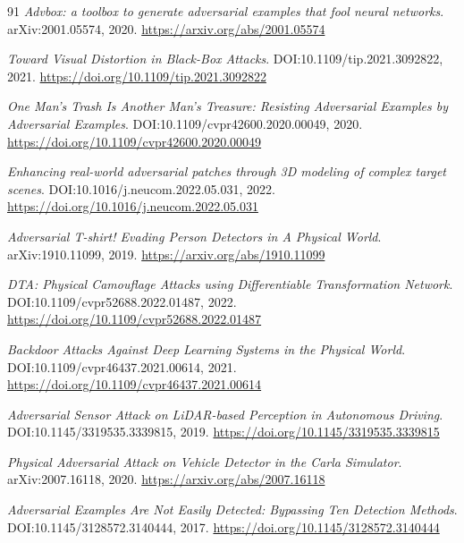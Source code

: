 \documentclass[11pt,a4paper]{article}
\begin{document}
\begin{thebibliography}{91}
\newblock \emph{Advbox: a toolbox to generate adversarial examples that fool neural networks}.
\newblock arXiv:2001.05574, 2020.
\newblock \url{https://arxiv.org/abs/2001.05574}

\newblock \emph{Toward Visual Distortion in Black-Box Attacks}.
\newblock DOI:10.1109/tip.2021.3092822, 2021.
\newblock \url{https://doi.org/10.1109/tip.2021.3092822}

\newblock \emph{One Man's Trash Is Another Man's Treasure: Resisting Adversarial Examples by Adversarial Examples}.
\newblock DOI:10.1109/cvpr42600.2020.00049, 2020.
\newblock \url{https://doi.org/10.1109/cvpr42600.2020.00049}

\newblock \emph{Enhancing real-world adversarial patches through 3D modeling of complex target scenes}.
\newblock DOI:10.1016/j.neucom.2022.05.031, 2022.
\newblock \url{https://doi.org/10.1016/j.neucom.2022.05.031}

\newblock \emph{Adversarial T-shirt! Evading Person Detectors in A Physical World}.
\newblock arXiv:1910.11099, 2019.
\newblock \url{https://arxiv.org/abs/1910.11099}

\newblock \emph{DTA: Physical Camouflage Attacks using Differentiable Transformation Network}.
\newblock DOI:10.1109/cvpr52688.2022.01487, 2022.
\newblock \url{https://doi.org/10.1109/cvpr52688.2022.01487}

\newblock \emph{Backdoor Attacks Against Deep Learning Systems in the Physical World}.
\newblock DOI:10.1109/cvpr46437.2021.00614, 2021.
\newblock \url{https://doi.org/10.1109/cvpr46437.2021.00614}

\newblock \emph{Adversarial Sensor Attack on LiDAR-based Perception in Autonomous Driving}.
\newblock DOI:10.1145/3319535.3339815, 2019.
\newblock \url{https://doi.org/10.1145/3319535.3339815}

\newblock \emph{Physical Adversarial Attack on Vehicle Detector in the Carla Simulator}.
\newblock arXiv:2007.16118, 2020.
\newblock \url{https://arxiv.org/abs/2007.16118}

\newblock \emph{Adversarial Examples Are Not Easily Detected: Bypassing Ten Detection Methods}.
\newblock DOI:10.1145/3128572.3140444, 2017.
\newblock \url{https://doi.org/10.1145/3128572.3140444}


\end{thebibliography}
\end{document}
